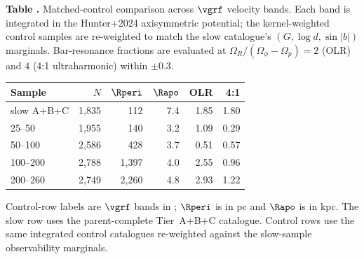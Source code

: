 \begin{center}
\label{tab:band_comparison}
\begin{minipage}{\columnwidth}
\small\textbf{Table \thetable.} Matched-control comparison across
$\vgrf$ velocity bands. Each band is integrated in the Hunter+2024
axisymmetric potential; the kernel-weighted control samples are
re-weighted to match the slow catalogue's $(G,\log d, \sin|b|)$
marginals. Bar-resonance fractions are evaluated at
$\Omega_R/(\Omega_\phi-\Omega_p)=2$ (OLR) and $4$ (4{:}1
ultraharmonic) within $\pm 0.3$.
\end{minipage}
\vspace{0.4ex}

\small
\setlength{\tabcolsep}{2pt}
\begin{tabular}{@{}lrrrrr@{}}
\hline\hline
Sample & $N$ & $\Rperi$ & $\Rapo$ & OLR & 4{:}1 \\
\hline
slow A+B+C             & 1{,}835 & 112 & 7.4 & 1.85 & 1.80 \\
25--50                 & 1{,}955 & 140 & 3.2 & 1.09 & 0.29 \\
50--100                & 2{,}586 & 428 & 3.7 & 0.51 & 0.57 \\
100--200               & 2{,}788 & 1{,}397 & 4.0 & 2.55 & 0.96 \\
200--260               & 2{,}749 & 2{,}260 & 4.8 & 2.93 & 1.22 \\
\hline
\end{tabular}
\par\smallskip
\footnotesize Control-row labels are $\vgrf$ bands in \kms; $\Rperi$ is
in pc and $\Rapo$ is in kpc. The slow row uses the parent-complete
Tier~A+B+C catalogue. Control rows use the same integrated control
catalogues re-weighted against the slow-sample observability marginals.
\end{center}
